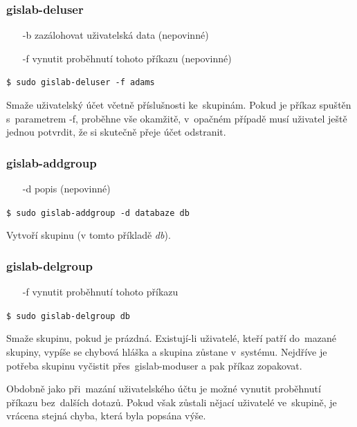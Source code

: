 \newpage
\subsubsection{gislab-deluser}
\begin{itemize}
\item [-b] zazálohovat uživatelská data (nepovinné)
\item [-f] vynutit proběhnutí tohoto příkazu (nepovinné)
\end{itemize}

\begin{center}
\texttt{\$ sudo gislab-deluser -f adams}
\end{center}

Smaže uživatelský účet včetně příslušnosti ke~skupinám. Pokud je
příkaz spuštěn s~parametrem \textsf{-f}, proběhne vše okamžitě, 
v~opačném případě musí uživatel ještě jednou potvrdit, že si skutečně
přeje účet odstranit.

\subsubsection{gislab-addgroup}
\begin{itemize}
\item [-d] popis (nepovinné)
\end{itemize}

\begin{center}
\texttt{\$ sudo gislab-addgroup -d databaze db}
\end{center}

Vytvoří skupinu (v tomto příkladě \textit{db}).

\subsubsection{gislab-delgroup}
\begin{itemize}
\item [-f] vynutit proběhnutí tohoto příkazu
\end{itemize}

\begin{center}
\texttt{\$ sudo gislab-delgroup db}
\end{center}

Smaže skupinu, pokud je prázdná. Existují-li uživatelé, kteří patří 
do~mazané skupiny, vypíše se chybová hláška a skupina zůstane 
v~systému. Nejdříve je potřeba skupinu vyčistit 
přes~\textsf{gislab-moduser} a pak příkaz zopakovat.

Obdobně jako při~mazání uživatelského účtu je možné vynutit proběhnutí
příkazu bez~dalších dotazů. Pokud však zůstali nějací uživatelé 
ve~skupině, je vrácena stejná chyba, která byla popsána výše.

